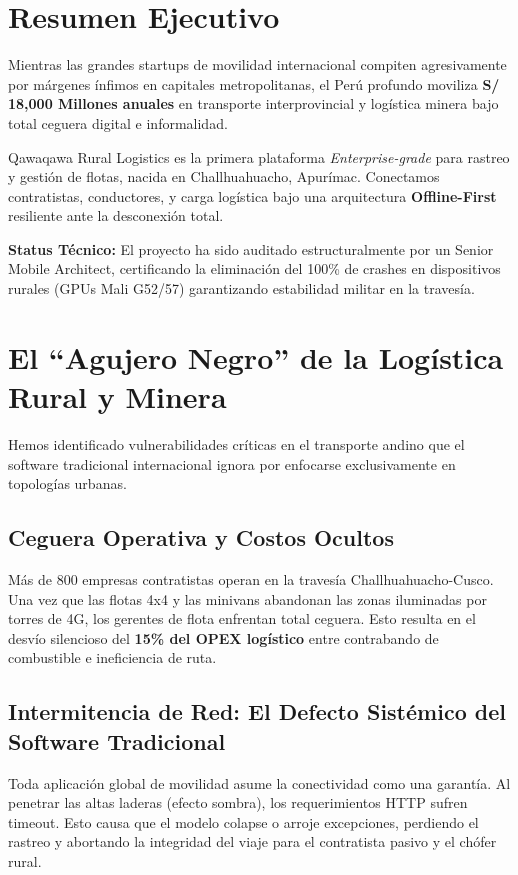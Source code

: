 \documentclass[11pt,a4paper,table]{article}
\begin{document}
\tableofcontents
\newpage
\listoftables
\newpage
\listoffigures
\newpage


\section{Resumen Ejecutivo}
Mientras las grandes startups de movilidad internacional compiten agresivamente por márgenes ínfimos en capitales metropolitanas, el Perú profundo moviliza \textbf{S/ 18,000 Millones anuales} en transporte interprovincial y logística minera bajo total ceguera digital e informalidad.

Qawaqawa Rural Logistics es la primera plataforma \textit{Enterprise-grade} para rastreo y gestión de flotas, nacida en Challhuahuacho, Apurímac. Conectamos contratistas, conductores, y carga logística bajo una arquitectura \textbf{Offline-First} resiliente ante la desconexión total.

\begin{signalbox}
\textbf{Status Técnico:} El proyecto ha sido auditado estructuralmente por un Senior Mobile Architect, certificando la eliminación del 100\% de crashes en dispositivos rurales (GPUs Mali G52/57) garantizando estabilidad militar en la travesía.
\end{signalbox}

\section{El ``Agujero Negro'' de la Logística Rural y Minera}
Hemos identificado vulnerabilidades críticas en el transporte andino que el software tradicional internacional ignora por enfocarse exclusivamente en topologías urbanas.

\subsection{Ceguera Operativa y Costos Ocultos}
Más de 800 empresas contratistas operan en la travesía Challhuahuacho-Cusco. Una vez que las flotas 4x4 y las minivans abandonan las zonas iluminadas por torres de 4G, los gerentes de flota enfrentan total ceguera. Esto resulta en el desvío silencioso del \textbf{15\% del OPEX logístico} entre contrabando de combustible e ineficiencia de ruta.

\subsection{Intermitencia de Red: El Defecto Sistémico del Software Tradicional}
Toda aplicación global de movilidad asume la conectividad como una garantía. Al penetrar las altas laderas (efecto sombra), los requerimientos HTTP sufren timeout. Esto causa que el modelo colapse o arroje excepciones, perdiendo el rastreo y abortando la integridad del viaje para el contratista pasivo y el chófer rural.
\end{document}

